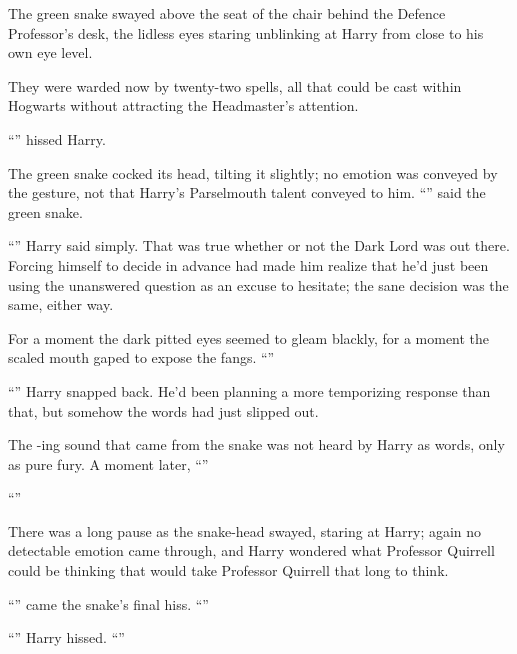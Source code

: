 The green snake swayed above the seat of the chair behind the Defence Professor’s desk, the lidless eyes staring unblinking at Harry from close to his own eye level.

They were warded now by twenty-two spells, all that could be cast within Hogwarts without attracting the Headmaster’s attention.

“” hissed Harry.

The green snake cocked its head, tilting it slightly; no emotion was conveyed by the gesture, not that Harry’s Parselmouth talent conveyed to him. “” said the green snake.

“” Harry said simply. That was true whether or not the Dark Lord was out there. Forcing himself to decide in advance had made him realize that he’d just been using the unanswered question as an excuse to hesitate; the sane decision was the same, either way.

For a moment the dark pitted eyes seemed to gleam blackly, for a moment the scaled mouth gaped to expose the fangs. “”

“” Harry snapped back. He’d been planning a more temporizing response than that, but somehow the words had just slipped out.

The -ing sound that came from the snake was not heard by Harry as words, only as pure fury. A moment later, “”

“”

There was a long pause as the snake-head swayed, staring at Harry; again no detectable emotion came through, and Harry wondered what Professor Quirrell could be thinking that would take Professor Quirrell that long to think.

“” came the snake’s final hiss. “”

“” Harry hissed. “”

